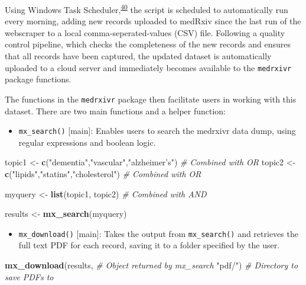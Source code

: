 \documentclass[a4paper, nobind]{templates/ociamthesis}
\providecommand{\tightlist}{%
  \setlength{\itemsep}{0pt}\setlength{\parskip}{0pt}}
\newenvironment{Shaded}{\begin{snugshade}}{\end{snugshade}}
\newcommand{\CommentTok}[1]{\textcolor[rgb]{0.56,0.35,0.01}{\textit{#1}}}
\newcommand{\KeywordTok}[1]{\textcolor[rgb]{0.13,0.29,0.53}{\textbf{#1}}}
\newcommand{\NormalTok}[1]{#1}
\newcommand{\StringTok}[1]{\textcolor[rgb]{0.31,0.60,0.02}{#1}}
\renewenvironment{Shaded}
{
  \vspace{4pt}%
  \begin{snugshade}%
}{%
  \end{snugshade}%
  \vspace{4pt}%
}
\begin{document}
Using Windows Task Scheduler,\textsuperscript{\protect\hyperlink{ref-zotero-880}{40}} the script is scheduled to automatically run every morning, adding new records uploaded to medRxiv since the last run of the webscraper to a local comma-seperated-values (CSV) file. Following a quality control pipeline, which checks the completeness of the new records and ensures that all records have been captured, the updated dataset is automatically uploaded to a cloud server and immediately becomes available to the \texttt{medrxivr} package functions.

The functions in the \texttt{medrxivr} package then facilitate users in working with this dataset. There are two main functions and a helper function:

\begin{itemize}
\tightlist
\item
  \texttt{mx\_search()} {[}main{]}: Enables users to search the medrxivr data dump, using regular expressions and boolean logic.
\end{itemize}

\begin{Shaded}
\begin{Highlighting}[]
\NormalTok{topic1  <-}\StringTok{ }\KeywordTok{c}\NormalTok{(}\StringTok{"dementia"}\NormalTok{,}\StringTok{"vascular"}\NormalTok{,}\StringTok{"alzheimer's"}\NormalTok{)  }\CommentTok{# Combined with OR}
\NormalTok{topic2  <-}\StringTok{ }\KeywordTok{c}\NormalTok{(}\StringTok{"lipids"}\NormalTok{,}\StringTok{"statins"}\NormalTok{,}\StringTok{"cholesterol"}\NormalTok{)     }\CommentTok{# Combined with OR}

\NormalTok{myquery <-}\StringTok{ }\KeywordTok{list}\NormalTok{(topic1, topic2)                    }\CommentTok{# Combined with AND}

\NormalTok{results <-}\StringTok{ }\KeywordTok{mx_search}\NormalTok{(myquery)}
\end{Highlighting}
\end{Shaded}

\begin{itemize}
\tightlist
\item
  \texttt{mx\_download()} {[}main{]}: Takes the output from \texttt{mx\_search()} and retrieves the full text PDF for each record, saving it to a folder specified by the user.
\end{itemize}

\begin{Shaded}
\begin{Highlighting}[]
\KeywordTok{mx_download}\NormalTok{(results,        }\CommentTok{# Object returned by mx_search}
            \StringTok{"pdf/"}\NormalTok{)         }\CommentTok{# Directory to save PDFs to }
\end{Highlighting}
\end{Shaded}
\end{document}
